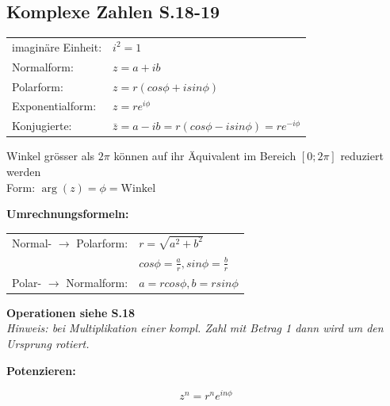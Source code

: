 \subsection{Komplexe Zahlen \texorpdfstring{\hfill S.18-19}{S.18-19}}
       \vspace{3pt}
       
       \def\arraystretch{1.5}
       \begin{tabular*}{\linewidth}{ll}
           imaginäre Einheit: & $i^2 = 1$ \\
           Normalform: & $ z = a + ib $ \\
           Polarform: & $ z = r(cos\phi + isin\phi) $ \\
           Exponentialform: & $ z = re^{i\phi} $ \\
           Konjugierte: & $ \bar{z} = a\!-\!ib = r(cos\phi\!-\!isin\phi) = re^{-i\phi} $
       \end{tabular*}
       \vspace{5pt}
       
       Winkel grösser als $2\pi$ können auf ihr Äquivalent im Bereich $[0; 2\pi]$ reduziert werden \\[3pt]
       Form: $\arg (z) = \phi = \textrm{Winkel}$ \vspace{6pt}
       
       \textbf{Umrechnungsformeln:}
       
       \vspace{3pt}
       
       \begin{tabular*}{\linewidth}{ll}
           Normal- $\rightarrow$ Polarform: & $ r = \sqrt{a^2 + b^2} $ \\
           & $ cos\phi = \frac{a}{r}, sin\phi = \frac{b}{r} $ \\
           Polar- $\rightarrow$ Normalform: & $ a = rcos\phi, b = rsin\phi $
       \end{tabular*}
       
       \vspace{5pt}
       
       \textbf{Operationen siehe S.18}\\[3pt]
       \textit{Hinweis: bei Multiplikation einer kompl. Zahl mit Betrag 1 dann wird um den Ursprung rotiert.} \vspace{5pt}
       
       \cbreak
       
       \textbf{Potenzieren:}
       
       $$z^n = r^n e^{in\phi} $$
       
